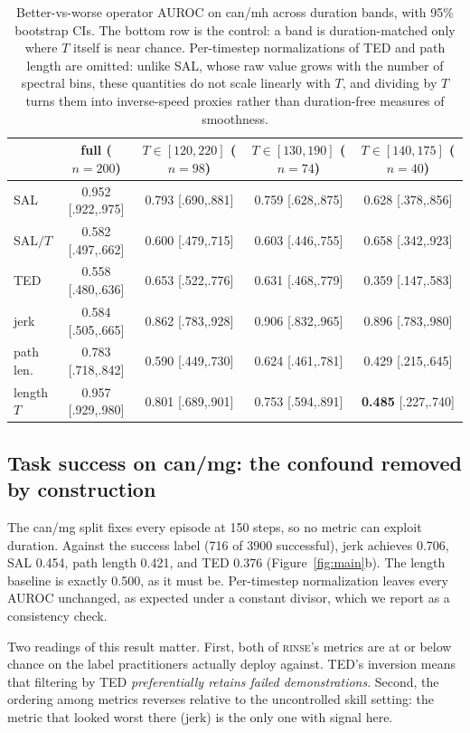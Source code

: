 \documentclass{article}
\newcommand{\rinse}{\textsc{rinse}}
\begin{document}
\begin{table}[t]
\centering
\small
\begin{tabular}{lcccc}
\toprule
& full ($n{=}200$) & $T \in [120,220]$ ($n{=}98$) & $T \in [130,190]$ ($n{=}74$) & $T \in [140,175]$ ($n{=}40$) \\
\midrule
SAL       & 0.952 [.922,.975] & 0.793 [.690,.881] & 0.759 [.628,.875] & 0.628 [.378,.856] \\
SAL$/T$   & 0.582 [.497,.662] & 0.600 [.479,.715] & 0.603 [.446,.755] & 0.658 [.342,.923] \\
TED       & 0.558 [.480,.636] & 0.653 [.522,.776] & 0.631 [.468,.779] & 0.359 [.147,.583] \\
jerk      & 0.584 [.505,.665] & 0.862 [.783,.928] & 0.906 [.832,.965] & 0.896 [.783,.980] \\
path len. & 0.783 [.718,.842] & 0.590 [.449,.730] & 0.624 [.461,.781] & 0.429 [.215,.645] \\
\midrule
length $T$ & 0.957 [.929,.980] & 0.801 [.689,.901] & 0.753 [.594,.891] & \textbf{0.485} [.227,.740] \\
\bottomrule
\end{tabular}
\caption{Better-vs-worse operator AUROC on can/mh across duration bands,
with 95\% bootstrap CIs. The bottom row is the control: a band is
duration-matched only where $T$ itself is near chance. Per-timestep
normalizations of TED and path length are omitted: unlike SAL, whose raw
value grows with the number of spectral bins, these quantities do not scale
linearly with $T$, and dividing by $T$ turns them into inverse-speed
proxies rather than duration-free measures of smoothness.}
\label{tab:bands}
\end{table}

\subsection{Task success on can/mg: the confound removed by construction}

The can/mg split fixes every episode at 150 steps, so no metric can exploit
duration. Against the success label (716 of 3900 successful), jerk achieves
0.706, SAL 0.454, path length 0.421, and TED 0.376
(Figure~\ref{fig:main}b). The length baseline is exactly 0.500, as it must
be. Per-timestep normalization leaves every AUROC unchanged, as expected
under a constant divisor, which we report as a consistency check.

Two readings of this result matter. First, both of \rinse{}'s metrics are at
or below chance on the label practitioners actually deploy against. TED's
inversion means that filtering by TED \emph{preferentially retains failed
demonstrations}. Second, the ordering among metrics reverses relative to the
uncontrolled skill setting: the metric that looked worst there (jerk) is the
only one with signal here.
\end{document}
